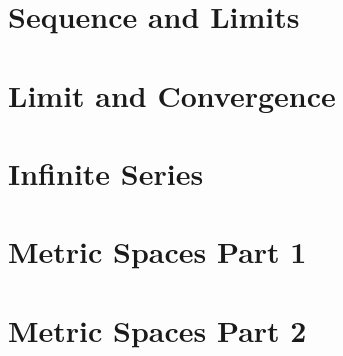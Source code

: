 \documentclass[10pt,a4paper]{article}
\begin{document}


\section{Sequence and Limits}



\section{Limit and Convergence}




\section{Infinite Series}






\section{Metric Spaces Part 1}





\section{Metric Spaces Part 2}




\end{document}
